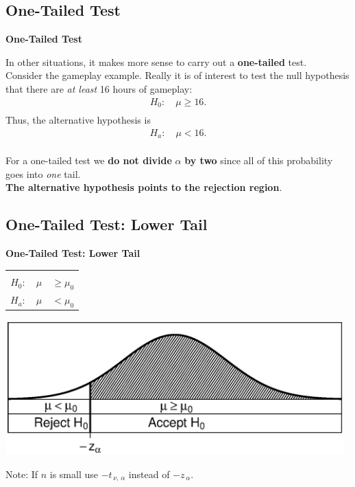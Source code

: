 \documentclass[compress]{beamer}        %
\makeatletter
\newcommand{\tcb}{\textcolor{beamer@blendedblue}}
\makeatother
\begin{document}
\subsection{One-Tailed Test}
\begin{frame}{\bf \tcb{One-Tailed Test}}

In other situations, it makes more sense to carry out a {\bf one-tailed} test.\\[0.4cm]

Consider the gameplay example. Really it is of interest to test the null hypothesis that there are \emph{at least} 16 hours of gameplay:\\[-0.2cm]
\begin{align*}
H_0: \quad \mu \ge 16.\\[-0.3cm]
\end{align*}
Thus, the alternative hypothesis is\\[-0.2cm]
\begin{align*}
H_a: \quad \mu < 16.\\[-0.3cm]
\end{align*}

For a one-tailed test we {\bf do not divide} \boldmath$\alpha$ {\bf by two} since all of this probability goes into \emph{one} tail.\\[0.4cm]

{\bf The alternative hypothesis points to the rejection region}.

\end{frame}


\subsection{One-Tailed Test: Lower Tail}
\begin{frame}{\bf \tcb{One-Tailed Test: Lower Tail}}
\begin{center}
\begin{tabular}{|c@{\,\,}c|}
\hline
&\\[-0.4cm]
$H_0: \quad \mu$ & $\ge \mu_0$ \\[0.2cm]
$H_a: \quad \mu$ &  $< \mu_0$ \\[0.1cm]
\hline
\end{tabular}
\end{center}
\begin{center}
\includegraphics[width=0.98\textwidth, trim = 1.5cm 1.6cm 0.7cm 1.5cm, clip]{AcceptRegionOne1}
\end{center}
Note: If $n$ is small use  $- t_{\,\nu,\,\alpha}$ instead of $- z_{\,\alpha}$.
\end{frame}
\end{document}
